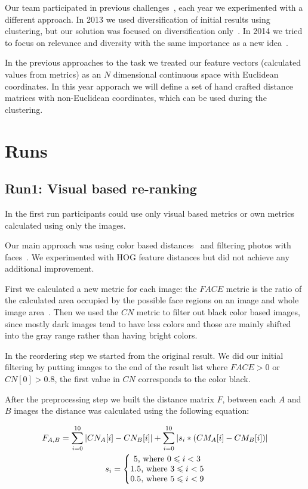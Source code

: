 \documentclass{acm_proc_article-me}
\begin{document}
Our team participated in previous challenges~\cite{szHucs2013bmemtm,Paroczi2014}, each year we experimented with a different approach. In 2013 we used diversification of initial results using clustering, but our solution was focused on diversification only~\cite{szHucs2013bmemtm}. In 2014 we tried to focus on relevance and diversity with the same importance as a new idea~\cite{Paroczi2014}.

In the previous approaches to the task we treated our feature vectors (calculated values from metrics) as an $N$ dimensional continuous space with Euclidean coordinates. In this year apporach we will define a set of hand crafted distance matrices with non-Euclidean coordinates, which can be used during the clustering. 

\section{Runs}

\subsection{Run1: Visual based re-ranking}\label{run1}
In the first run participants could use only visual based metrics or own metrics calculated using only the images.

Our main approach was using color based distances~\cite{Datta2008,Paramita2010} and filtering photos with faces~\cite{szHucs2013bmemtm,Paroczi2014}. We experimented with HOG feature distances but did not achieve any additional improvement.

First we calculated a new metric for each image: the $FACE$ metric is the ratio of the calculated area occupied by the possible face regions on an image and whole
image area~\cite{szHucs2013bmemtm}. Then we used the $CN$ metric to filter out black color based images, since mostly dark images tend to have less colors and those are mainly shifted into the gray range rather than having bright colors.

In the reordering step we started from the original result. We did our initial filtering by putting images to the end of the result list where $FACE>0$ or $CN[0]>0.8$, the first value in $CN$ corresponds to the color black.

After the preprocessing step we built the distance matrix $F$, between each $A$ and $B$ images the distance was calculated using the following equation:

\begin{gather*} 
F_{A,B} = \sum_{i=0}^{10}  \left | CN_{A}[i]-CN_{B}[i] \right | +\sum_{i=0}^{10} \left | s_i * (CM_{A}[i]-CM_{B}[i]) \right |\\
s_i = \left\{\begin{matrix}
5 \textup{, where }0 \leqslant  i < 3\\ 
1.5 \textup{, where }3 \leqslant  i < 5\\ 
0.5 \textup{, where }5 \leqslant  i < 9
\end{matrix}\right.
\end{gather*}
\end{document}
